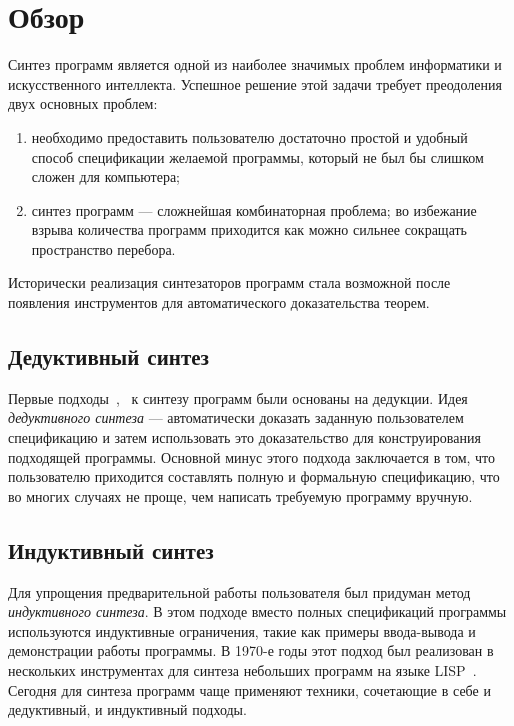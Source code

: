 \documentclass[14pt]{matmex-diploma}
\begin{document}
\section{Обзор}
Синтез программ является одной из наиболее значимых проблем информатики и искусственного интеллекта. Успешное решение этой задачи требует преодоления двух основных проблем:
\begin{enumerate}
    \item необходимо предоставить пользователю достаточно простой и удобный способ спецификации желаемой программы, который не был бы слишком сложен для компьютера;
    \item синтез программ --- сложнейшая комбинаторная проблема; во избежание взрыва количества программ приходится как можно сильнее сокращать пространство перебора.
\end{enumerate}
Исторически реализация синтезаторов программ стала возможной после появления инструментов для автоматического доказательства теорем.
\subsection{Дедуктивный синтез}
Первые подходы~\cite{deductive1},~\cite{Zohar} к синтезу программ были основаны на дедукции. Идея \emph{дедуктивного синтеза} --- автоматически доказать заданную пользователем спецификацию и затем использовать это доказательство для конструирования подходящей программы. Основной минус этого подхода заключается в том, что пользователю приходится составлять полную и формальную спецификацию, что во многих случаях не проще, чем написать требуемую программу вручную.
\subsection{Индуктивный синтез}
Для упрощения предварительной работы пользователя был придуман метод \emph{индуктивного синтеза}. В этом подходе вместо полных спецификаций программы используются индуктивные ограничения, такие как примеры ввода-вывода и демонстрации работы программы. В 1970-е годы этот подход был реализован в нескольких инструментах для синтеза небольших программ на языке LISP~\cite{Shaw}. Сегодня для синтеза программ чаще применяют техники, сочетающие в себе и дедуктивный, и индуктивный подходы.
\end{document}
